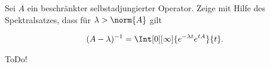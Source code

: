 \begin{exercise}[37/3]

Sei $A$ ein beschränkter selbstadjungierter Operator.
Zeige mit Hilfe des Spektralsatzes, dass für $\lambda > \norm{A}$ gilt

\begin{align*}
  (A - \lambda)^{-1}
  =
  \Int[0][\infty]{e^{-\lambda t} e^{t A}}{t}.
\end{align*}

\end{exercise}

\begin{solution}

ToDo!

\end{solution}
